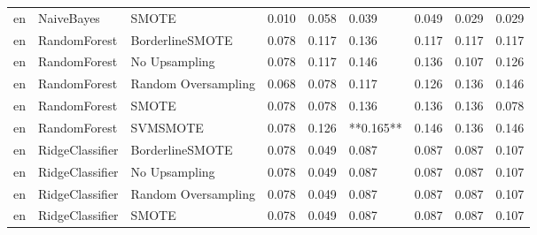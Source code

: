 \begin{tabular}{lllllllll}
      en &                      NaiveBayes &                         SMOTE &     0.010 &                     0.058 &                 0.039 &                  0.049 &                                   0.029 &     0.029 \\
      en &                    RandomForest &               BorderlineSMOTE &     0.078 &                     0.117 &                 0.136 &                  0.117 &                                   0.117 &     0.117 \\
      en &                    RandomForest &                 No Upsampling &     0.078 &                     0.117 &                 0.146 &                  0.136 &                                   0.107 &     0.126 \\
      en &                    RandomForest &           Random Oversampling &     0.068 &                     0.078 &                 0.117 &                  0.126 &                                   0.136 &     0.146 \\
      en &                    RandomForest &                         SMOTE &     0.078 &                     0.078 &                 0.136 &                  0.136 &                                   0.136 &     0.078 \\
      en &                    RandomForest &                      SVMSMOTE &     0.078 &                     0.126 &             **0.165** &                  0.146 &                                   0.136 &     0.146 \\
      en &                 RidgeClassifier &               BorderlineSMOTE &     0.078 &                     0.049 &                 0.087 &                  0.087 &                                   0.087 &     0.107 \\
      en &                 RidgeClassifier &                 No Upsampling &     0.078 &                     0.049 &                 0.087 &                  0.087 &                                   0.087 &     0.107 \\
      en &                 RidgeClassifier &           Random Oversampling &     0.078 &                     0.049 &                 0.087 &                  0.087 &                                   0.087 &     0.107 \\
      en &                 RidgeClassifier &                         SMOTE &     0.078 &                     0.049 &                 0.087 &                  0.087 &                                   0.087 &     0.107 \\

\end{tabular}
